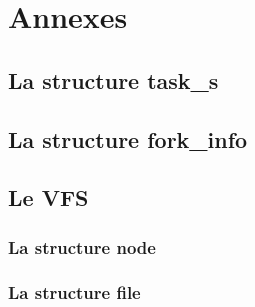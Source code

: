 \section*{Annexes}

  \subsection*{La structure task\_s}
  
     \label{lst:task}
    
  \subsection*{La structure fork\_info}

  
    
    \newpage

  \subsection*{Le VFS}

    \subsubsection*{La structure node}

      
      \label{lst:vfs_node}
  
    \subsubsection*{La structure file}
   
      
      \label{lst:vfs_file}
  
